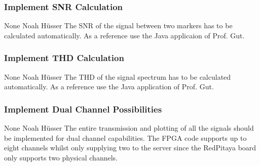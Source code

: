 \documentclass[a4paper,oneside]{alpenspecs/alpenspecs}
\begin{document}
\subsubsection{Implement SNR Calculation}
\label{subsec:frontend:}
\wpac
     {}
     {}
     {}
     {None}
     {}
     {Noah Hüsser}
     {%
         The SNR of the signal between two markers has to be calculated automatically.
         As a reference use the Java applicaion of Prof. Gut.
     }

\subsubsection{Implement THD Calculation}
\label{subsec:frontend:}
\wpac
     {}
     {}
     {}
     {None}
     {}
     {Noah Hüsser}
     {%
         The THD of the signal spectrum has to be calculated automatically.
         As a reference use the Java application of Prof. Gut.
     }

\subsubsection{Implement Dual Channel Possibilities}
\label{subsec:frontend:}
\wpac
     {}
     {}
     {}
     {None}
     {}
     {Noah Hüsser}
     {%
         The entire transmission and plotting of all the signals should be implemented for dual channel capabilities.
         The FPGA code supports up to eight channels whilst only supplying two to the server since the RedPitaya board only supports two physical channels.
     }


\backmatter
\end{document}
